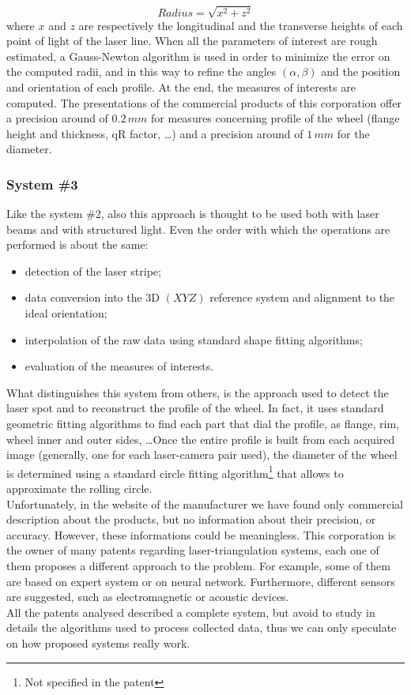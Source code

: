   \begin{equation*}
    Radius = \sqrt{x^2 + z^2}
  \end{equation*}
where $x$ and $z$ are respectively the longitudinal and the transverse heights of each point of light of the laser line.
When all the parameters of interest are rough estimated, a Gauss-Newton algorithm is used in order to minimize the error on the computed radii, and in this way to refine the angles $\left( \alpha, \beta \right)$ and the position and orientation of each profile. At the end, the measures of interests are computed. The presentations of the commercial products of this corporation offer a precision around of $0.2 \, mm$ for measures concerning profile of the wheel (flange height and thickness, qR factor, \ldots) and a precision around of $1 \, mm$ for the diameter.
 
 
\subsubsection{System \#3} %
Like the system \#2, also this approach is thought to be used both with laser beams and with structured light. Even the order with which the operations are performed is about the same:
  \begin{itemize}
    \item detection of the laser stripe;
    \item data conversion into the 3D $\left(XYZ\right)$ reference system and alignment to the ideal orientation;
    \item interpolation of the raw data using standard shape fitting algorithms;
    \item evaluation of the measures of interests.
  \end{itemize}
What distinguishes this system from others, is the approach used to detect the laser spot and to reconstruct the profile of the wheel. In fact, it uses standard geometric fitting algorithms to find each part that dial the profile, as flange, rim, wheel inner and outer sides, \ldots Once the entire profile is built from each acquired image (generally, one for each laser-camera pair used), the diameter of the wheel is determined using a standard circle fitting algorithm\footnote{Not specified in the patent} that allows to approximate the rolling circle. \\

Unfortunately, in the website of the manufacturer we have found only commercial description about the products, but no information about their precision, or accuracy. However, these informations could be meaningless. This corporation is the owner of many patents regarding laser-triangulation systems, each one of them proposes a different approach to the problem. For example, some of them are based on expert system or on neural network. Furthermore, different sensors are suggested, such as electromagnetic or acoustic devices. \\
All the patents analysed described a complete system, but avoid to study in details the algorithms used to process collected data, thus we can only speculate on how proposed systems really work.

